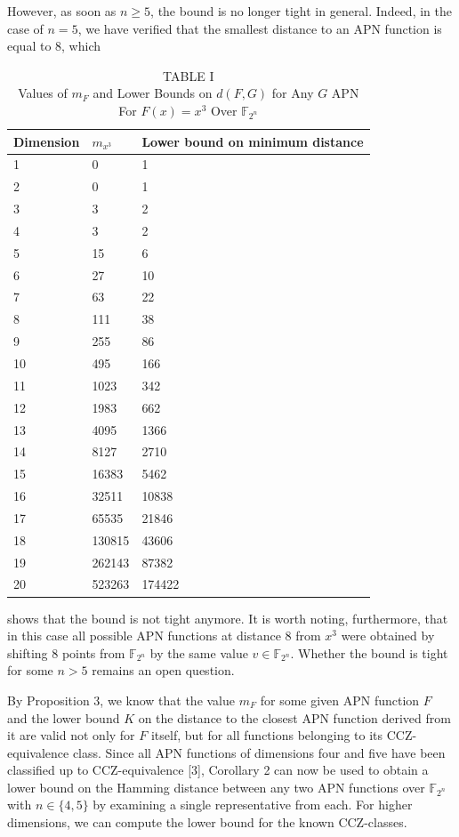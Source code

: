 \documentclass[10pt]{article}
\begin{document}
However, as soon as $n \geq 5$, the bound is no longer tight in general. Indeed, in the case of $n=5$, we have verified that the smallest distance to an APN function is equal to 8, which

\begin{table}[h]
\begin{center}
\captionsetup{labelformat=empty}
\caption{TABLE I\\
Values of $m_{F}$ and Lower Bounds on $d(F, G)$ for Any $G$ APN For $F(x)=x^{3}$ Over $\mathbb{F}_{2^{n}}$}
\begin{tabular}{|l|l|l|}
\hline
Dimension & $m_{x^{3}}$ & Lower bound on minimum distance \\
\hline
1 & 0 & 1 \\
\hline
2 & 0 & 1 \\
\hline
3 & 3 & 2 \\
\hline
4 & 3 & 2 \\
\hline
5 & 15 & 6 \\
\hline
6 & 27 & 10 \\
\hline
7 & 63 & 22 \\
\hline
8 & 111 & 38 \\
\hline
9 & 255 & 86 \\
\hline
10 & 495 & 166 \\
\hline
11 & 1023 & 342 \\
\hline
12 & 1983 & 662 \\
\hline
13 & 4095 & 1366 \\
\hline
14 & 8127 & 2710 \\
\hline
15 & 16383 & 5462 \\
\hline
16 & 32511 & 10838 \\
\hline
17 & 65535 & 21846 \\
\hline
18 & 130815 & 43606 \\
\hline
19 & 262143 & 87382 \\
\hline
20 & 523263 & 174422 \\
\hline
\end{tabular}
\end{center}
\end{table}

shows that the bound is not tight anymore. It is worth noting, furthermore, that in this case all possible APN functions at distance 8 from $x^{3}$ were obtained by shifting 8 points from $\mathbb{F}_{2^{n}}$ by the same value $v \in \mathbb{F}_{2^{n}}$. Whether the bound is tight for some $n>5$ remains an open question.

By Proposition 3, we know that the value $m_{F}$ for some given APN function $F$ and the lower bound $K$ on the distance to the closest APN function derived from it are valid not only for $F$ itself, but for all functions belonging to its CCZ-equivalence class. Since all APN functions of dimensions four and five have been classified up to CCZ-equivalence [3], Corollary 2 can now be used to obtain a lower bound on the Hamming distance between any two APN functions over $\mathbb{F}_{2^{n}}$ with $n \in\{4,5\}$ by examining a single representative from each. For higher dimensions, we can compute the lower bound for the known CCZ-classes.
\end{document}
